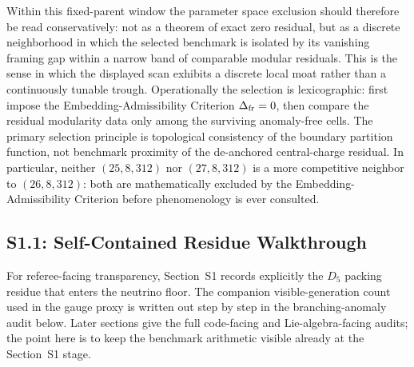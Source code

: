 \documentclass[11pt]{article}
\begin{document}
Within this fixed-parent window the parameter space exclusion should therefore be read conservatively: not as a theorem of exact zero residual, but as a discrete neighborhood in which the selected benchmark is isolated by its vanishing framing gap within a narrow band of comparable modular residuals. This is the sense in which the displayed scan exhibits a discrete local moat rather than a continuously tunable trough. Operationally the selection is lexicographic: first impose the Embedding-Admissibility Criterion $\Delta_{\rm fr}=0$, then compare the residual modularity data only among the surviving anomaly-free cells. The primary selection principle is topological consistency of the boundary partition function, not benchmark proximity of the de-anchored central-charge residual. In particular, neither $(25,8,312)$ nor $(27,8,312)$ is a more competitive neighbor to $(26,8,312)$: both are mathematically excluded by the Embedding-Admissibility Criterion before phenomenology is ever consulted.

\subsection*{S1.1: Self-Contained Residue Walkthrough}
\label{supp-sec:s11-self-contained-residues}

For referee-facing transparency, Section~S1 records explicitly the $D_5$ packing residue that enters the neutrino floor. The companion visible-generation count used in the gauge proxy is written out step by step in the branching-anomaly audit below. Later sections give the full code-facing and Lie-algebra-facing audits; the point here is to keep the benchmark arithmetic visible already at the Section~S1 stage.
\end{document}
